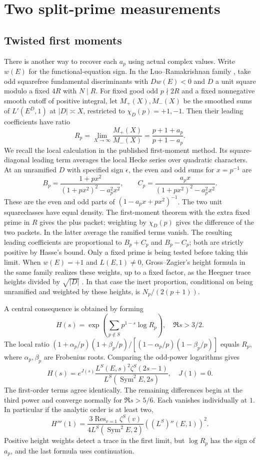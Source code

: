 \documentclass[11pt]{article}
\begin{document}
\section{Two split-prime measurements}
\subsection{Twisted first moments}
There is another way to recover each $a_p$ using actual complex values. Write $w(E)$ for the functional-equation sign. In the Luo--Ramakrishnan family \cite[(2.7)--(2.8)]{LR}, take odd squarefree fundamental discriminants with $D w(E)<0$ and $D$ a unit square modulo a fixed $4R$ with $N\mid R$. For fixed good odd $p\nmid2R$ and a fixed nonnegative smooth cutoff of positive integral, let $M_+(X),M_-(X)$ be the smoothed sums of $L'(E^D,1)$ at $|D|\asymp X$, restricted to $\chi_D(p)=+1,-1$. Then their leading coefficients have ratio
\[
 R_p=\lim_{X\to\infty}\frac{M_+(X)}{M_-(X)}
 =\frac{p+1+a_p}{p+1-a_p}.
\]
We recall the local calculation in the published first-moment method. Its square-diagonal leading term averages the local Hecke series over quadratic characters. At an unramified $D$ with specified sign $\epsilon$, the even and odd sums for $x=p^{-1}$ are
\[
 B_p=\frac{1+px^2}{(1+px^2)^2-a_p^2x^2},\qquad
 C_p=\frac{a_p x}{(1+px^2)^2-a_p^2x^2}.
\]
These are the even and odd parts of $(1-a_px+px^2)^{-1}$. The two unit squareclasses have equal density. The first-moment theorem with the extra fixed prime in $R$ gives the plus packet; weighting by $\chi_D(p)$ gives the difference of the two packets. In the latter average the ramified terms vanish. The resulting leading coefficients are proportional to $B_p+C_p$ and $B_p-C_p$; both are strictly positive by Hasse's bound. Only a fixed prime is being tested before taking this limit. When $w(E)=+1$ and $L(E,1)\ne0$, Gross--Zagier's height formula in the same family realizes these weights, up to a fixed factor, as the Heegner trace heights divided by $\sqrt{|D|}$ \cite[(2.2),(2.6)]{LR}. In that case the inert proportion, conditional on being unramified and weighted by these heights, is $N_p/(2(p+1))$.

A central consequence is obtained by forming
\[
 H(s)=\exp\left(\sum_{p\notin S}p^{1-s}\log R_p\right),\quad \Re s>3/2 .
\]
The local ratio $(1+\alpha_p/p)(1+\beta_p/p)/[(1-\alpha_p/p)(1-\beta_p/p)]$ equals $R_p$, where $\alpha_p,\beta_p$ are Frobenius roots. Comparing the odd-power logarithms gives
\[
 H(s)=e^{J(s)}
 \frac{L^S(E,s)^2\zeta^S(2s-1)}{L^S(\operatorname{Sym}^2 E,2s)},
 \quad J(1)=0 .
\]
The first-order terms agree identically. The remaining differences begin at the third power and converge normally for $\Re s>5/6$. Each vanishes individually at $1$. In particular if the analytic order is at least two,
\[
 H'''(1)=
 \frac{3\operatorname{Res}_{v=1}\zeta^S(v)}
      {4L^S(\operatorname{Sym}^2E,2)}
       \left((L^S)''(E,1)\right)^2.
\]
Positive height weights detect a trace in the first limit, but $\log R_p$ has the sign of $a_p$, and the last formula uses continuation.
\end{document}
